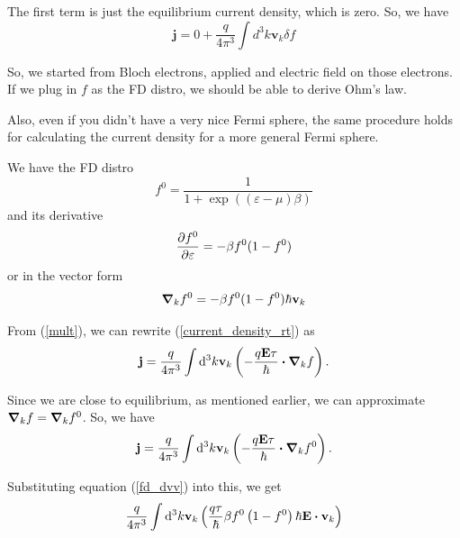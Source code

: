 \documentclass[a4paper]{article}
\newcommand{\hcut}{\hbar}
\begin{document}
The first term is just the equilibrium current density, which is zero.
So, we have
\begin{equation}
	\label{current_density_rt}
	\mathbf{j} = 0 + \frac{q}{4\pi ^3}\int d^3k \mathbf{v}_k \delta f
\end{equation}

So, we started from Bloch electrons, applied and electric field
on those electrons. If we plug in $f$ as the FD distro, we should
be able to derive Ohm's law.

Also, even if you didn't have a very nice Fermi sphere, the same
procedure holds for calculating the current density for a more
general Fermi sphere.

We have the FD distro
\begin{equation}
	f^{0} = \frac{1}{1 + \exp((\varepsilon - \mu)\beta)}
\end{equation}
and its derivative
\begin{equation}
	\label{fd_dv}
	\pdv{f^{0}}{\varepsilon} = -\beta f^{0}(1 - f^{0})
\end{equation}
or in the vector form
\begin{equation}
	\label{fd_dvv}
	\grad_k f^{0} = -\beta f^{0}(1 - f^{0})\hcut \mathbf{v}_k
\end{equation}

From (\ref{mult}), we can rewrite (\ref{current_density_rt}) as
\begin{equation}
	\mathbf{j} = \frac{q}{4\pi^3}\int \dd ^3 k \mathbf{v}_k \left( -\frac{q\textbf{E}\tau}{\hcut}\vdot\grad_k f \right).
\end{equation}

Since we are close to equilibrium, as mentioned earlier, we can approximate
$\grad_k f = \grad_k f^{0}$. So, we have
\begin{equation}
	\mathbf{j} = \frac{q}{4\pi^3} \int \dd ^3 k \mathbf{v}_k \left( -\frac{q\textbf{E}\tau}{\hcut}\vdot\grad_kf^{0} \right).
\end{equation}

Substituting  equation (\ref{fd_dvv}) into this, we get
\begin{equation}
	\frac{q}{4\pi^3}\int \dd ^3 k \mathbf{v}_k\left( \frac{q\tau}{\hcut}\beta f^{0}\left( 1 - f^{0} \right) \hcut \mathbf{E}\vdot \mathbf{v}_k \right) 
\end{equation}
\end{document}
